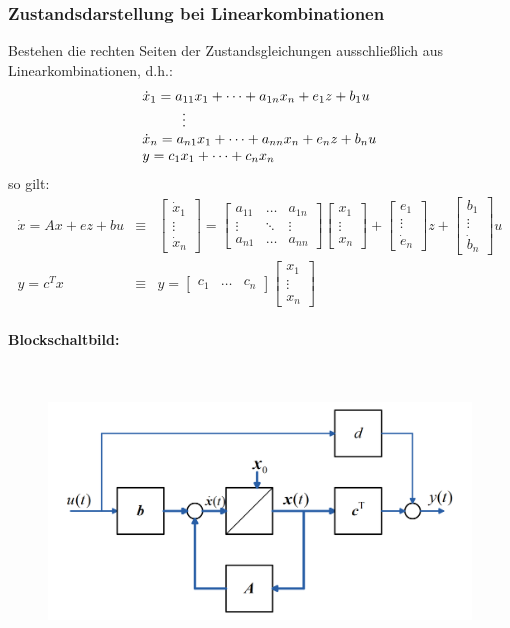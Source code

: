 \documentclass[10pt,a4paper]{article}
\newcommand{\tab}[1][1]{\hspace*{#1cm}}
\newcommand{\vect}[1]{\ensuremath{\begin{bmatrix}#1\end{bmatrix}}}
\begin{document}
\subsubsection{Zustandsdarstellung bei Linearkombinationen}
Bestehen die rechten Seiten der Zustandsgleichungen ausschließlich aus Linearkombinationen, d.h.:
$$
\begin{array}{l}
	\dot x_1 = a_{11} x_1 + \dots + a_{1n} x_n + e_1 z + b_1 u \\
	\tab \vdots \\
	\dot x_n = a_{n1} x_1 + \dots + a_{nn} x_n + e_n z + b_n u \\
	y = c_1 x_1 + \dots + c_n x_n
\end{array}	
$$
so gilt:
$$
\begin{array}{lcl}
	\dot{x} = A x + e z + b u & ≡ & \vect{\dot x_1 \\ \vdots \\ \dot x_n} = \vect{a_{11} & \dots & a_{1n} \\ \vdots & \ddots & \vdots \\ a_{n1} & \dots & a_{nn}} \vect{x_1 \\ \vdots \\ x_n} + \vect{e_1 \\ \vdots \\ \dot e_n} z + \vect{b_1 \\ \vdots \\ \dot b_n} u \\
	y = c^Tx & ≡ & y = \vect{c_1 & \dots & c_n} \vect{x_1 \\ \vdots \\ x_n}
\end{array}
$$

\paragraph*{Blockschaltbild:} ~\\
\begin{figure}[H]
	\includegraphics[width=0.8\columnwidth]{imgs/abb2_12.png}
\end{figure}
\end{document}
